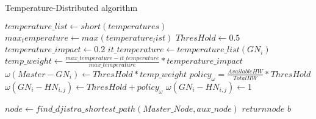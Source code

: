 \begin{algorithm}
\caption{Temperature-Distributed algorithm}\label{alg:tempdistrib}
\begin{algorithmic}[1]
\State $temperature\_list\gets short(temperatures)$
\State $max_temperature\gets max(temperature_list)$
\State $ThresHold\gets 0.5$
\State $temperature\_impact \gets 0.2$
\State $it\_temperature \gets temperature\_list(GN_i)$
\State $temp\_weight \gets \frac{max\_temperature-it\_temperature}{max\_temperature}*temperature\_impact$
\State $\omega(Master-GN_i) \gets ThresHold*temp\_weight$
    \State $policy_\omega = \frac{Available HW}{Total HW}*ThresHold$
    \State $\omega(GN_i-HN_{i,j}) \gets ThresHold+policy_\omega$
\Else
    \State $\omega(GN_i - HN_{i,j}) \gets 1$
\EndIf

\EndFor
\EndFor
\State $node \gets find\_djistra\_shortest\_path(Master\_Node, aux\_node)$
\State \textbf{$return node$} $b$
\EndProcedure
\end{algorithmic}
\end{algorithm}